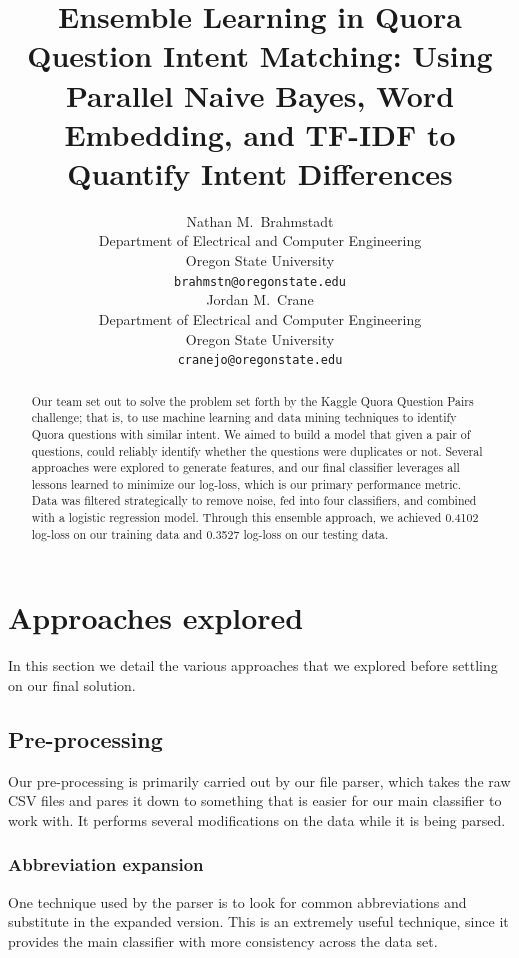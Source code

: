 \documentclass{article}
\title{Ensemble Learning in Quora Question Intent Matching:
Using Parallel Naive Bayes, Word Embedding, and TF-IDF to Quantify Intent Differences}
\author{
    Nathan M.~Brahmstadt \\
  Department of Electrical and Computer Engineering\\
  Oregon State University\\
  \texttt{brahmstn@oregonstate.edu} \\
  \And
  Jordan M.~Crane \\
  Department of Electrical and Computer Engineering \\
  Oregon State University \\
  \texttt{cranejo@oregonstate.edu} \\
}
\begin{document}

\maketitle

\begin{abstract}
    Our team set out to solve the problem set forth by the Kaggle Quora Question
    Pairs challenge; that is, to use machine learning and data mining techniques
    to identify Quora questions with similar intent. We aimed to build a model
    that given a pair of questions, could reliably identify whether the
    questions were duplicates or not. Several approaches were explored to
    generate features, and our final classifier leverages all lessons learned
    to minimize our log-loss, which is our primary performance metric. Data was
    filtered strategically to remove noise, fed into four classifiers,
    and combined with a logistic regression model. Through this ensemble
    approach, we achieved 0.4102 log-loss on our training data and 0.3527
    log-loss on our testing data.
\end{abstract}

\section{Approaches explored}

In this section we detail the various approaches that we explored before
settling on our final solution.

\subsection{Pre-processing}

Our pre-processing is primarily carried out by our file parser, which takes the
raw CSV files and pares it down to something that is easier for our main
classifier to work with. It performs several modifications on the data while it
is being parsed.

\subsubsection{Abbreviation expansion}

One technique used by the parser is to look for common abbreviations and
substitute in the expanded version. This is an extremely useful technique, since
it provides the main classifier with more consistency across the data set.
\end{document}
